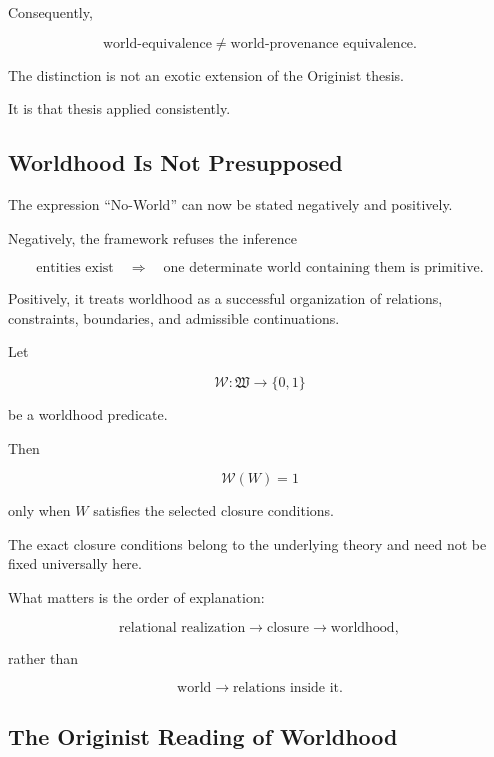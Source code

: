 \documentclass[
  11pt,
  a4paper,
  DIV=12,
  BCOR=0mm,
  parskip=half-
]{scrartcl}
\newcommand{\World}{\mathcal W}
\theoremstyle{definition}
\theoremstyle{plain}
\theoremstyle{remark}
\begin{document}
Consequently,

\[
  \text{world-equivalence}
  \neq
  \text{world-provenance equivalence}.
\]

The distinction is not an exotic extension of the Originist thesis.

It is that thesis applied consistently.


\subsection{Worldhood Is Not Presupposed}
\label{app:no-world-move}

The expression \enquote{No-World} can now be stated negatively and positively.

Negatively, the framework refuses the inference

\[
  \text{entities exist}
  \quad\Rightarrow\quad
  \text{one determinate world containing them is primitive}.
\]

Positively, it treats worldhood as a successful organization of relations,
constraints, boundaries, and admissible continuations.

Let

\[
  \World:
  \mathfrak W\to\{0,1\}
\]

be a worldhood predicate.

Then

\[
  \World(W)=1
\]

only when \(W\) satisfies the selected closure conditions.

The exact closure conditions belong to the underlying theory and need not be
fixed universally here.

What matters is the order of explanation:

\[
  \text{relational realization}
  \longrightarrow
  \text{closure}
  \longrightarrow
  \text{worldhood},
\]

rather than

\[
  \text{world}
  \longrightarrow
  \text{relations inside it}.
\]


\subsection{The Originist Reading of Worldhood}
\label{app:worldhood-originist}
\end{document}
